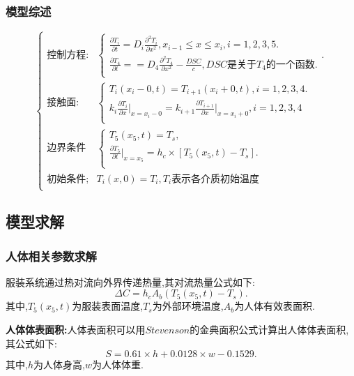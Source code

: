 \documentclass{whutmod}
\begin{document}
\subsubsection{模型综述}
\begin{equation}
\begin{cases}
\text{控制方程:}&\begin{cases}\frac{\partial T_{i}}{\partial t}=D_{i}\frac{\partial^{2}T_{i}}{\partial x^{2}},x_{i-1}\leq x \le x_{i},i=1,2,3,5.\\
\frac{\partial T_{4}}{\partial t}==D_{4}\frac{\partial^{2}T_{4}}{\partial x^{2}}-\frac{DSC}{c},\text{$DSC$是关于$T_{4}$的一个函数}.\\
\end{cases}.\\
\text{接触面:}&\begin{cases}T_{i}(x_{i}-0,t)=T_{i+1}(x_{i}+0,t),i=1,2,3,4.\\
k_{i} \frac{\partial T_{i}}{\partial x}\big|_{x=x_{i}-0}=k_{i+1} \frac{\partial T_{i+1}}{\partial x}\big|_{x=x_{i}+0},i=1,2,3,4\\
\end{cases}\\
\text{边界条件}&\begin{cases}T_{5}(x_{5},t)=T_{s},\\
\frac{\partial T_{5}}{\partial{t}}\big|_{x=x_{5}}=h_{c}\times[T_{5}(x_{5},t)-T_{s}].\\
\end{cases}\\
\text{初始条件;}& T_{i}(x,0)=T_{i},T_{i}\text{表示各介质初始温度}\\
\end{cases}
\end{equation}

\subsection{模型求解}
\subsubsection{人体相关参数求解}
服装系统通过热对流向外界传递热量,其对流热量公式如下:
\begin{equation}
\Delta C=h_{c}A_{b}(T_{5}(x_{5},t)-T_{s}).
\end{equation}
其中,$T_{5}(x_{5},t)$为服装表面温度,$T_{s}$为外部环境温度,$A_{b}$为人体有效表面积.

\textbf{人体体表面积:}人体表面积可以用$Stevenson$的金典面积公式计算出人体体表面积,其公式如下:
\begin{equation}
S=0.61\times h+0.0128\times w-0.1529.
\end{equation}
其中,$h$为人体身高,$w$为人体体重.
\end{document}
